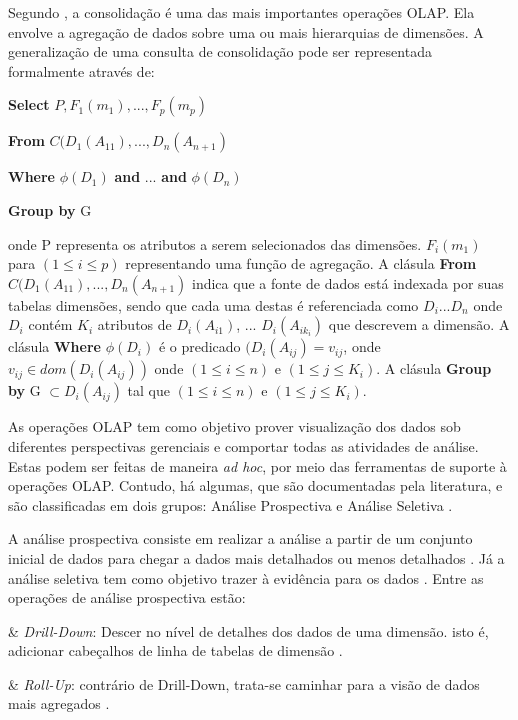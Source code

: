 Segundo , a consolidação é uma das mais importantes operações OLAP. Ela envolve a agregação de dados sobre uma ou mais hierarquias de dimensões. A generalização de uma consulta de consolidação pode ser representada formalmente através de: 

\textbf{Select} $\displaystyle P,F_{1}(m_1),..., F_p(m_p)$

\textbf{From} $\displaystyle C(D_1(A_{11}),...,D_n(A_{n+1})$

\textbf{Where} $\displaystyle \phi(D_1)$ \textbf{and} ... \textbf{and}  $\displaystyle\phi(D_n)$

\textbf{Group by} G

onde P representa os atributos a serem selecionados das dimensões. $\displaystyle F_{i}(m_1)$ para $\displaystyle (1 \leq i \leq p) $ representando uma função de agregação. A clásula \textbf{From} $\displaystyle C(D_1(A_{11}),...,D_n(A_{n+1})$ indica que a fonte de dados está indexada por suas tabelas dimensões, sendo que cada uma destas é referenciada como $\displaystyle D_i ... D_n $ onde  $\displaystyle D_i $ contém  $\displaystyle K_i$ atributos de  $\displaystyle D_i(A_{i1})$, ... $ \displaystyle D_i(A_{ik_{i}}) $ que descrevem a dimensão.  A clásula \textbf{Where} $\displaystyle \phi(D_i)$ é o predicado $\displaystyle (D_i(A_{ij}) = v_{ij}$, onde $\displaystyle v_{ij} \in dom(D_i(A_{ij}))$ onde $\displaystyle (1 \leq i \leq n) $ e $\displaystyle (1 \leq j \leq K_{i}) $. A clásula \textbf{Group by} G $\displaystyle \subset {D_{i}(A_{ij})} $ tal que $\displaystyle (1 \leq i \leq n) $ e $\displaystyle (1 \leq j \leq K_{i})$.


As operações OLAP tem como objetivo prover visualização dos dados sob diferentes perspectivas gerenciais e comportar todas as atividades de análise. Estas podem ser feitas de maneira \textit{ad hoc}, por meio das ferramentas de suporte à operações OLAP. Contudo, há algumas, que são documentadas pela literatura, e são classificadas em dois grupos: Análise Prospectiva e Análise Seletiva .

A análise prospectiva consiste em realizar a análise a partir de um conjunto inicial de dados para chegar a dados mais detalhados ou menos detalhados \cite{Inmon1992}. Já a análise seletiva tem como objetivo trazer à evidência para os dados \cite{andre2000}. Entre as operações de análise prospectiva estão:

\begin{easylist}[itemize]

& \textit{Drill-Down}: Descer no nível de detalhes dos dados de uma dimensão. isto é, adicionar cabeçalhos de linha de tabelas de dimensão \cite{Kimball2002}.

& \textit{Roll-Up}: contrário de Drill-Down, trata-se caminhar para a visão de dados mais agregados . 


\end{easylist}

